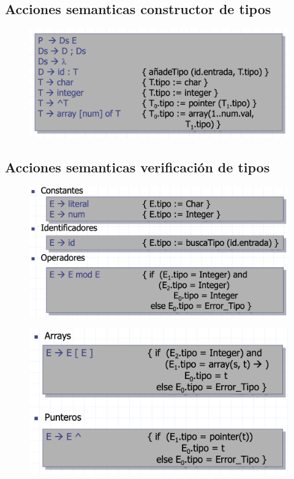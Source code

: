 \documentclass[12pt, twoside, openright]{report} %
\begin{document}
\subsection{Acciones semanticas constructor de tipos}
\begin{figure}[H]
  {\includegraphics[scale=.35]{Screenshot 2021-06-09 at 12.21.40.png}}
\end{figure}

\subsection{Acciones semanticas verificación de tipos}
\begin{figure}[H]
  {\includegraphics[scale=.3]{Screenshot 2021-06-09 at 12.23.29.png}}
\end{figure}
\begin{figure}[H]
  {\includegraphics[scale=.3]{Screenshot 2021-06-09 at 12.24.59.png}}
\end{figure}
\end{document}
